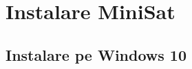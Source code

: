 \documentclass{llncs}
\begin{document}





\newpage

\section{Instalare MiniSat}

\subsection{Instalare pe Windows 10}
\end{document}
